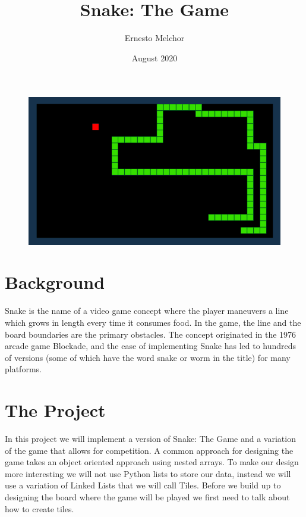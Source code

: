 \documentclass{article}
\title{Snake: The Game}
\author{Ernesto Melchor}
\date{August 2020}
\begin{document}
\maketitle
\begin{figure}[h!]
    \begin{center}
      \includegraphics[scale=0.3]{Snake.jpg}
    \end{center}
    \label{fig:snake}
\end{figure}

\section{Background}
Snake is the name of a video game concept where the player maneuvers a line which grows in length every time it consumes food. In the game, the line and the board boundaries are the primary obstacles. The concept originated in the 1976 arcade game Blockade, and the ease of implementing Snake has led to hundreds of versions (some of which have the word snake or worm in the title) for many platforms.

\section{The Project}
In this project we will implement a version of Snake: The Game and a variation of the game that allows for competition. A common approach for designing the game takes an object oriented approach using nested arrays. To make our design more interesting we will not use Python lists to store our data, instead we will use a variation of Linked Lists that we will call Tiles. Before we build up to designing the board where the game will be played we first need to talk about how to create tiles.
\end{document}
